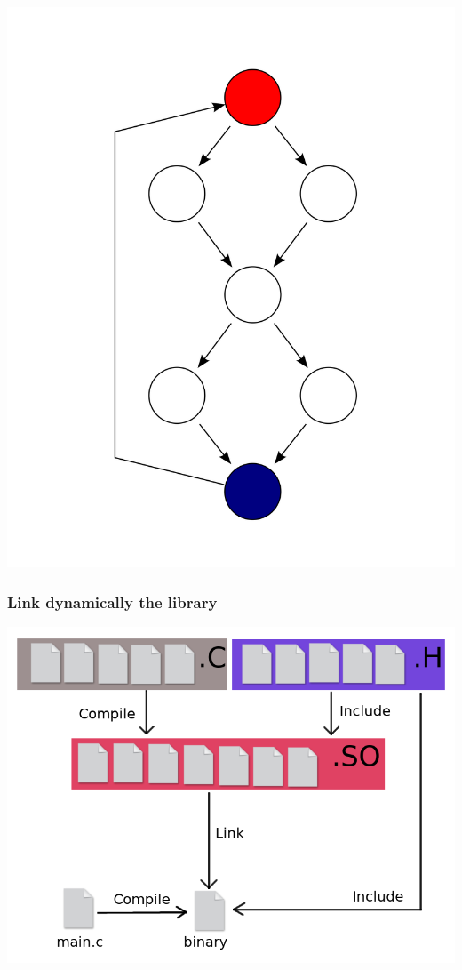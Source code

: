 \documentclass[11pt]{beamer}
\begin{document}
\begin{frame}
\begin{center}
    \includegraphics[scale=0.05]{cfg.png}
    \end{center}

\end{frame}

\begin{frame}
    \frametitle{Link dynamically the library}
    \includegraphics[scale=0.38]{compil1.png}
\end{frame}
\end{document}
